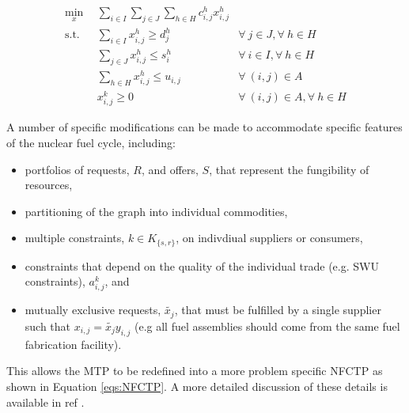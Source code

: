 \begin{subequations}\label{eqs:MCTP}
  \begin{align}
    \min_{x} \:\: & 
    \sum_{i \in I}\sum_{j \in J}\sum_{h \in H} c_{i,j}^{h} x_{i,j}^{h}
    & \label{eqs:MCTP_obj} \\
    \text{s.t.} \:\: 
    &
    \sum_{i \in I} x_{i,j}^{h} \geq d_{j}^{h}
    & 
    \forall \: j \in J, \forall \: h \in H \label{eqs:MCTP_dem} \\
    &
    \sum_{j \in J} x_{i,j}^{h} \leq s_{i}^{h}
    &
    \forall \: i \in I, \forall \: h \in H \label{eqs:MCTP_sup} \\
    &
    \sum_{h \in H} x_{i,j}^{h} \leq u_{i,j}
    & 
    \forall \: (i, j) \in A \label{eqs:MCTP_cap} \\
    &
    x_{i,j}^{k} \geq 0
    &
    \forall \: (i, j) \in A, \forall \: h \in H \label{eqs:MCTP_x}
  \end{align}
\end{subequations}


A number of specific modifications can be made to accommodate specific
features of the nuclear fuel cycle, including:
\begin{itemize}
\item portfolios of requests, $R$, and offers, $S$, that represent the
  fungibility of resources,
\item partitioning of the graph into individual commodities,
\item multiple constraints, $k \in K_{\{s,r\}}$, on indivdiual suppliers or consumers,
\item constraints that depend on the quality of the individual trade (e.g. SWU
  constraints), $a_{i,j}^k$, and
\item mutually exclusive requests, $\tilde{x_j}$, that must be fulfilled by a
  single supplier such that $x_{i,j} = \tilde{x_j} y_{i,j}$ (e.g all fuel
  assemblies should come from the same fuel fabrication facility).
\end{itemize}
This allows the \gls{MTP} to be redefined into a more problem specific
\gls{NFCTP} as shown in Equation \ref{eqs:NFCTP}.  A more detailed discussion
of these details is available in ref \cite{dre_paper}.

